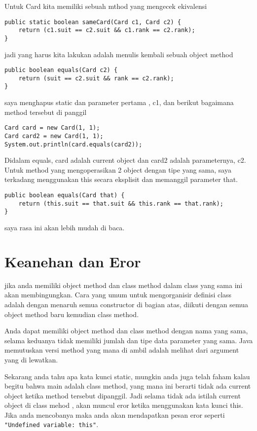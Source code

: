 Untuk Card kita memiliki sebuah mthod yang mengecek ekivalensi 
\begin{lstlisting}
public static boolean sameCard(Card c1, Card c2) {
	return (c1.suit == c2.suit && c1.rank == c2.rank);
}
\end{lstlisting}

jadi yang harus kita lakukan adalah menulis kembali sebuah object method 
\begin{lstlisting}
public boolean equals(Card c2) {
	return (suit == c2.suit && rank == c2.rank);
}
\end{lstlisting}

saya menghapus static dan parameter pertama , c1, dan berikut bagaimana method tersebut di panggil
\begin{lstlisting}
Card card = new Card(1, 1);
Card card2 = new Card(1, 1);
System.out.println(card.equals(card2));
\end{lstlisting}

Didalam equals, card adalah current object dan card2 adalah parameternya, c2. Untuk method yang mengoperasikan 2 object dengan tipe yang sama, saya terkadang menggunakan this secara eksplisit dan memanggil parameter that. 
\begin{lstlisting}
public boolean equals(Card that) {
	return (this.suit == that.suit && this.rank == that.rank);
}
\end{lstlisting}

saya rasa ini akan lebih mudah di baca.

\section{Keanehan dan Eror} %

jika anda memiliki object method dan class method dalam class yang sama ini akan membingungkan. Cara yang umum untuk mengorganisir definisi class adalah dengan menaruh semua constructor di bagian atas, diikuti dengan semua object method baru kemudian class method. 

Anda dapat memiliki object method dan class method dengan nama yang sama, selama keduanya tidak memiliki jumlah dan tipe data parameter yang sama. Java memutuskan versi method yang mana di ambil adalah melihat dari argument yang di lewatkan.

Sekarang anda tahu apa kata kunci static, mungkin anda juga telah faham kalau begitu bahwa main adalah class method, yang mana ini berarti tidak ada current object ketika method tersebut dipanggil. Jadi selama tidak ada istilah current object di class mehod , akan muncul eror ketika menggunakan kata kunci this. Jika anda mencobanya maka anda akan mendapatkan pesan eror seperti \texttt{"Undefined variable: this"}.

